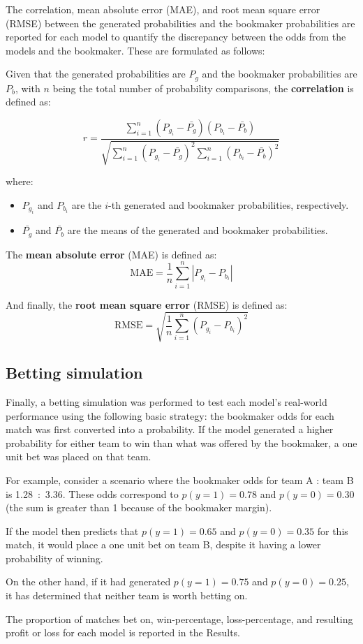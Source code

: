The correlation, mean absolute error (MAE), and root mean square error (RMSE) between the generated probabilities and the bookmaker probabilities are reported for each model to quantify the discrepancy between the odds from the models and the bookmaker. These are formulated as follows:\label{bettingstats}

Given that the generated probabilities are \( P_g \) and the bookmaker probabilities are \( P_b \), with \( n \) being the total number of probability comparisons, the \textbf{correlation} is defined as:

\[
r = \frac{\sum_{i=1}^{n} (P_{g_i} - \bar{P_g})(P_{b_i} - \bar{P_b})}{\sqrt{\sum_{i=1}^{n} (P_{g_i} - \bar{P_g})^2 \sum_{i=1}^{n} (P_{b_i} - \bar{P_b})^2}}
\]

where:
\begin{itemize}
	\item \( P_{g_i} \) and \( P_{b_i} \) are the \( i \)-th generated and bookmaker probabilities, respectively.
	\item \( \bar{P_g} \) and \( \bar{P_b} \) are the means of the generated and bookmaker probabilities.
\end{itemize}

The \textbf{mean absolute error} (MAE) is defined as:
\[
\text{MAE} = \frac{1}{n} \sum_{i=1}^{n} |P_{g_i} - P_{b_i}|
\]

And finally, the \textbf{root mean square error} (RMSE) is defined as:
\[
\text{RMSE} = \sqrt{\frac{1}{n} \sum_{i=1}^{n} (P_{g_i} - P_{b_i})^2}
\]

\subsection{Betting simulation}

Finally, a betting simulation was performed to test each model's real-world performance using the following basic strategy: the bookmaker odds for each match was first converted into a probability. If the model generated a higher probability for either team to win than what was offered by the bookmaker, a one unit bet was placed on that team. 

For example, consider a scenario where the bookmaker odds for team A : team B is 1.28~:~3.36. These odds correspond to $p(y=1)=0.78$ and $p(y=0)=0.30$ (the sum is greater than 1 because of the bookmaker margin).

If the model then predicts that $p(y=1)=0.65$ and $p(y=0)=0.35$ for this match, it would place a one unit bet on team B, despite it having a lower probability of winning. 

On the other hand, if it had generated $p(y=1)=0.75$ and $p(y=0)=0.25$, it has determined that neither team is worth betting on.

The proportion of matches bet on, win-percentage, loss-percentage, and resulting profit or loss for each model is reported in the Results. 